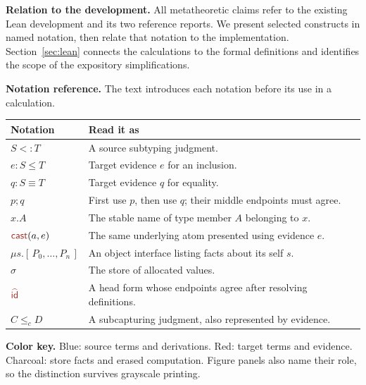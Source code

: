 \documentclass[11pt,a4paper]{article}
\newcommand{\src}[1]{{\color{srccol}#1}}
\newcommand{\tgt}[1]{{\color{tgtcol}#1}}
\newcommand{\run}[1]{{\color{runcol}#1}}
\newcommand{\ev}[1]{\tgt{\mathsf{#1}}}
\newcommand{\cast}[2]{\ev{cast}(#1,#2)}
\newcommand{\obj}[1]{\mu s.[\,#1\,]}
\newcommand{\form}[1]{\tgt{\widehat{\mathsf{#1}}}}
\begin{document}
\textbf{Relation to the development.}
All metatheoretic claims refer to the existing Lean development and its
two reference reports. We present selected constructs in named notation,
then relate that notation to the implementation.
Section~\ref{sec:lean} connects the calculations to the formal definitions
and identifies the scope of the expository simplifications.

\clearpage
\setcounter{tocdepth}{1}
\setlength{\cftbeforesecskip}{3pt}
\renewcommand{\cftsecfont}{\small}
\renewcommand{\cftsecpagefont}{\small}
\begingroup
\setlength{\parskip}{0pt}
\tableofcontents
\endgroup
\thispagestyle{fancy}
\bigskip
\textbf{Notation reference.}
The text introduces each notation before its use in a calculation.
\begin{center}
\renewcommand{\arraystretch}{1.25}
\begin{tabularx}{\linewidth}{@{}lX@{}}
\toprule
Notation & Read it as\\
\midrule
$S<:T$ & A source subtyping judgment.\\
$e:S\le T$ & Target evidence $e$ for an inclusion.\\
$q:S\equiv T$ & Target evidence $q$ for equality.\\
$p;q$ & First use $p$, then use $q$; their middle endpoints must agree.\\
$x.A$ & The stable name of type member $A$ belonging to $x$.\\
$\cast{a}{e}$ & The same underlying atom presented using evidence $e$.\\
$\obj{P_0,\ldots,P_n}$ & An object interface listing facts about its self $s$.\\
$\sigma$ & The store of allocated values.\\
$\form{id}$ & A head form whose endpoints agree after resolving definitions.\\
$C\le_c D$ & A subcapturing judgment, also represented by evidence.\\
\bottomrule
\end{tabularx}
\end{center}
\small
\textbf{Color key.} \src{Blue: source terms and derivations.}
\tgt{Red: target terms and evidence.}
\run{Charcoal: store facts and erased computation.}
Figure panels also name their role, so the distinction survives grayscale printing.
\normalsize

\clearpage



\clearpage
\end{document}
